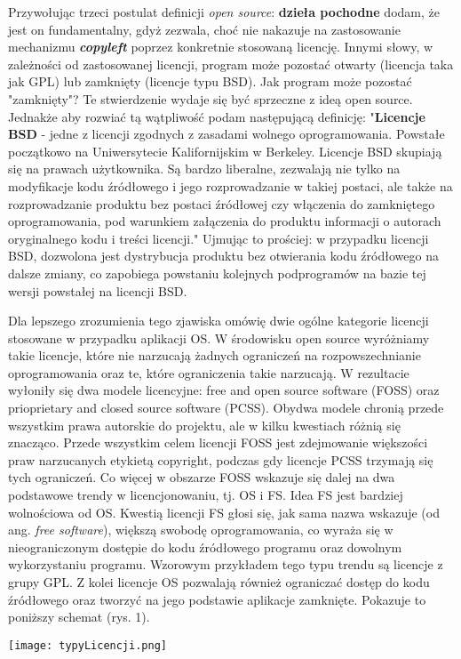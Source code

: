 \documentclass{article}
\begin{document}
Przywołując trzeci postulat definicji \emph{open source}: \textbf{dzieła pochodne} dodam, że jest on fundamentalny, gdyż zezwala, choć nie nakazuje na zastosowanie mechanizmu \textbf{\emph{copyleft}} poprzez konkretnie stosowaną licencję. Innymi słowy, w zależności od zastosowanej licencji, program może pozostać otwarty (licencja taka jak GPL) lub zamknięty (licencje typu BSD)\cite{Kotula}. Jak program może pozostać "zamknięty"? Te stwierdzenie wydaje się być sprzeczne z ideą open source. Jednakże aby rozwiać tą wątpliwość podam następującą definicję: "\textbf{Licencje BSD} - jedne z licencji zgodnych z zasadami wolnego oprogramowania. Powstałe początkowo na Uniwersytecie Kalifornijskim w Berkeley. Licencje BSD skupiają się na prawach użytkownika. Są bardzo liberalne, zezwalają nie tylko na modyfikacje kodu źródłowego i jego rozprowadzanie w takiej postaci, ale także na rozprowadzanie produktu bez postaci źródłowej czy włączenia do zamkniętego oprogramowania, pod warunkiem załączenia do produktu informacji o autorach oryginalnego kodu i treści licencji\cite{wikipedia3}." Ujmując to prościej: w przypadku licencji BSD, dozwolona jest dystrybucja produktu bez otwierania kodu źródłowego na dalsze zmiany, co zapobiega powstaniu kolejnych podprogramów na bazie tej wersji powstałej na licencji BSD.

Dla lepszego zrozumienia tego zjawiska omówię dwie ogólne kategorie licencji stosowane w przypadku aplikacji OS. W środowisku open source wyróżniamy takie licencje, które nie narzucają żadnych ograniczeń na rozpowszechnianie oprogramowania oraz te, które ograniczenia takie narzucają. W rezultacie wyłoniły się dwa modele licencyjne: free and open source software (FOSS) oraz prioprietary and closed source software (PCSS). Obydwa modele chronią przede wszystkim prawa autorskie do projektu, ale w kilku kwestiach różnią się znacząco. Przede wszystkim celem licencji FOSS jest zdejmowanie większości praw narzucanych etykietą copyright, podczas gdy licencje PCSS trzymają się tych ograniczeń. Co więcej w obszarze FOSS wskazuje się dalej na dwa podstawowe trendy w licencjonowaniu, tj. OS i FS. Idea FS jest bardziej wolnościowa od OS. Kwestią licencji FS głosi się, jak sama nazwa wskazuje (od ang. \emph{free software}), większą swobodę oprogramowania, co wyraża się w nieograniczonym dostępie do kodu źródłowego programu oraz dowolnym wykorzystaniu programu. Wzorowym przykładem tego typu trendu są licencje z grupy GPL. Z kolei licencje OS pozwalają również ograniczać dostęp do kodu źródłowego oraz tworzyć na jego podstawie aplikacje zamknięte\cite{Kotula}. Pokazuje to poniższy schemat (rys. 1).
\begin{center}
    \texttt{[image: typyLicencji.png]}
\end{center}
\end{document}
